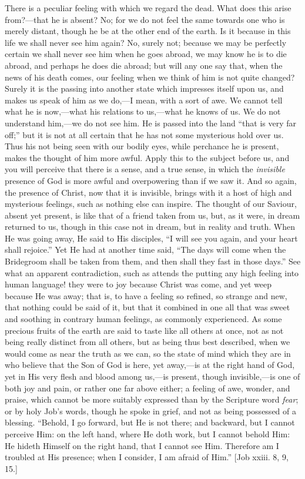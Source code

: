 There is a peculiar feeling with which we regard the dead. What
does this arise from?—that he is absent? No; for we do not feel the
same towards one who is merely distant, though he be at the other end
of the earth. Is it because in this life we shall never see him again?
No, surely not; because we may be perfectly certain we shall never see
him when he goes abroad, we may know he is to die abroad, and perhaps
he does die abroad; but will any one say that, when the news of his
death comes, our feeling when we think of him is not quite changed?
Surely it is the passing into another state which impresses itself
upon us, and makes us speak of him as we do,—I mean, with a sort of
awe. We cannot tell what he is now,—what his relations to us,—what
he knows of us. We do not understand him,—we do not see him. He is
passed into the land ``that is very far off;'' but it is not
at all certain that he has not some mysterious hold over us. Thus his
not being seen with our bodily eyes, while perchance he is present,
makes the thought of him more awful. Apply this to the subject before
us, and you will perceive that there is a sense, and a true sense, in
which the \emph{invisible} presence of God is more awful and
overpowering than if we saw it. And so again, the presence of Christ,
now that it is invisible, brings with it a host of high and mysterious
feelings, such as nothing else can inspire. The thought of our Saviour,
absent yet present, is like that of a friend taken from us, but, as it
were, in dream returned to us, though in this case not in dream, but
in reality and truth. When He was going away, He said to His
disciples, ``I will see you again, and your heart shall
rejoice.'' Yet He had at another time said, ``The days will
come when the Bridegroom shall be taken from them, and then shall they
fast in those days.'' See what an apparent contradiction, such as
attends the putting any high feeling into human language! they were to
joy because Christ was come, and yet weep because He was away; that
is, to have a feeling so refined, so strange and new, that nothing
could be said of it, but that it combined in one all that was sweet
and soothing in contrary human feelings, as commonly experienced. As
some precious fruits of the earth are said to taste like all others at
once, not as not being really distinct from all others, but as being
thus best described, when we would come as near the truth as we can,
so the state of mind which they are in who believe that the Son of God
is here, yet away,—is at the right hand of God, yet in His very
flesh and blood among us,—is present, though invisible,—is one of
both joy and pain, or rather one far above either; a feeling of awe,
wonder, and praise, which cannot be more suitably expressed than by
the Scripture word \emph{fear}; or by holy Job's words, though he
spoke in grief, and not as being possessed of a blessing.
``Behold, I go forward, but He is not there; and backward, but I
cannot perceive Him: on the left hand, where He doth work, but I
cannot behold Him: He hideth Himself on the right hand, that I cannot
see Him. Therefore am I troubled at His presence; when I consider, I
am afraid of Him.'' [Job xxiii. 8, 9, 15.]

